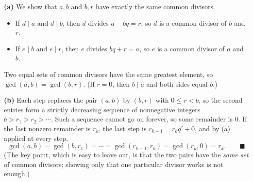 \textbf{(a)} We show that $a,b$ and $b,r$ have exactly the same common divisors.
\begin{itemize}
\item If $d\mid a$ and $d\mid b$, then $d$ divides $a-bq=r$, so $d$ is a common divisor of $b$ and $r$.
\item If $e\mid b$ and $e\mid r$, then $e$ divides $bq+r=a$, so $e$ is a common divisor of $a$ and $b$.
\end{itemize}
Two equal sets of common divisors have the same greatest element, so $\gcd(a,b)=\gcd(b,r)$. (If $r=0$, then $b\mid a$ and both sides equal $b$.)

\textbf{(b)} Each step replaces the pair $(a,b)$ by $(b,r)$ with $0\le r<b$, so the second entries form a strictly decreasing sequence of nonnegative integers $b>r_1>r_2>\cdots$. Such a sequence cannot go on forever, so some remainder is $0$. If the last nonzero remainder is $r_k$, the last step is $r_{k-1}=r_kq'+0$, and by (a) applied at every step,
\[
\gcd(a,b)=\gcd(b,r_1)=\cdots=\gcd(r_{k-1},r_k)=\gcd(r_k,0)=r_k. \qquad\blacksquare
\]
(The key point, which is easy to leave out, is that the two pairs have the \emph{same set} of common divisors; showing only that one particular divisor works is not enough.)
